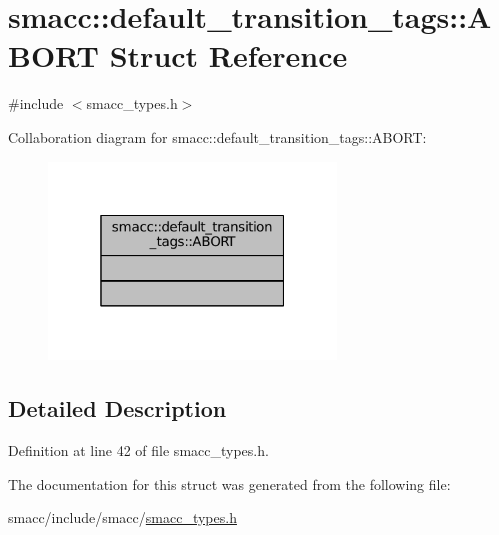 \hypertarget{structsmacc_1_1default__transition__tags_1_1ABORT}{}\section{smacc\+:\+:default\+\_\+transition\+\_\+tags\+:\+:A\+B\+O\+RT Struct Reference}
\label{structsmacc_1_1default__transition__tags_1_1ABORT}


{\ttfamily \#include $<$smacc\+\_\+types.\+h$>$}



Collaboration diagram for smacc\+:\+:default\+\_\+transition\+\_\+tags\+:\+:A\+B\+O\+RT\+:
\nopagebreak
\begin{figure}[H]
\begin{center}
\leavevmode
\includegraphics[width=217pt]{structsmacc_1_1default__transition__tags_1_1ABORT__coll__graph}
\end{center}
\end{figure}


\subsection{Detailed Description}


Definition at line 42 of file smacc\+\_\+types.\+h.



The documentation for this struct was generated from the following file\+:\begin{DoxyCompactItemize}
\item 
smacc/include/smacc/\hyperlink{smacc__types_8h}{smacc\+\_\+types.\+h}\end{DoxyCompactItemize}
